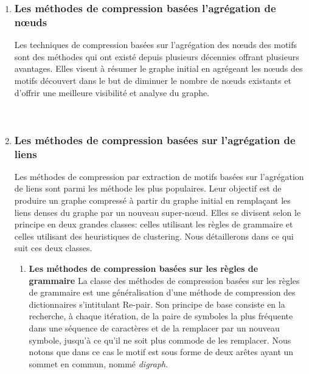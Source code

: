 \documentclass[a4paper,oneside,12pt]{report}
\theoremstyle{definition}
\begin{document}
					\begin{enumerate}[label=\alph*.]
				
					
					\item \subsubsection{Les méthodes de compression basées l'agrégation de nœuds}
					
					Les techniques de compression basées sur l'agrégation des nœuds des motifs sont des méthodes qui ont existé depuis plusieurs décennies offrant plusieurs avantages. 
					Elles visent à résumer le graphe initial en agrégeant les nœuds des motifs découvert dans le but de diminuer le nombre de nœuds existants  et d'offrir une meilleure visibilité et analyse du graphe. 
						
						\\
						
					
					\item \subsubsection{Les méthodes de compression basées sur l'agrégation de liens}
						Les méthodes de compression par extraction de motifs basées sur l'agrégation de liens sont parmi les méthode les plus populaires. Leur objectif est de produire un graphe compressé à partir du graphe initial en remplaçant les liens denses du graphe par un nouveau super-nœud. Elles se divisent selon le principe en deux grandes classes: celles utilisant les règles de grammaire et celles utilisant des heuristiques de clustering. Nous détaillerons dans ce qui suit ces deux classes.
						
						\begin{enumerate}[label*=\arabic*.]
							\item \textbf{Les méthodes de compression basées sur les règles de grammaire}
							La classe des méthodes de compression basées sur les règles de grammaire est une généralisation d'une méthode de compression des dictionnaires s'intitulant Re-pair. Son principe de base consiste en la  recherche, à chaque itération, de la paire de symboles la plus fréquente dans une séquence de caractères et de la remplacer par un nouveau symbole, jusqu'à ce qu'il ne soit plus commode de les remplacer. Nous notons que dans ce cas le motif est sous forme de deux arêtes ayant un sommet en commun, nommé \textit{digraph}.
								

\end{enumerate}
\end{enumerate}
\end{document}
